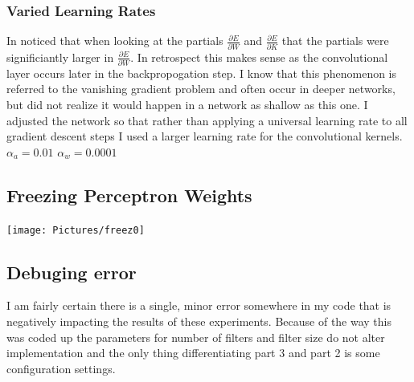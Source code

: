 \documentclass{article}
\begin{document}
\subsubsection{Varied Learning Rates}
In noticed that when looking at the partials $\frac{\partial E}{\partial W}$ and $\frac{\partial E}{\partial K}$ that the partials were significiantly larger in $\frac{\partial E}{\partial W}$.  In retrospect this makes sense as the convolutional layer occurs later in the backpropogation step.  I know that this phenomenon is referred to the vanishing gradient problem and often occur in deeper networks, but did not realize it would happen in a network as shallow as this one.  I adjusted the network so that rather than applying a universal learning rate to all gradient descent steps I used a larger learning rate for the convolutional kernels.
$\alpha_a = 0.01$ $\alpha_w = 0.0001$

\subsection{Freezing Perceptron Weights}

\texttt{[image: Pictures/freez0]}

\subsection{Debuging error}
I am fairly certain there is a single, minor error somewhere in my code that is negatively impacting the results of these experiments.  Because of the way this was coded up the parameters for number of filters and filter size do not alter implementation and the only thing differentiating part 3 and part 2 is some configuration settings.  
\end{document}
